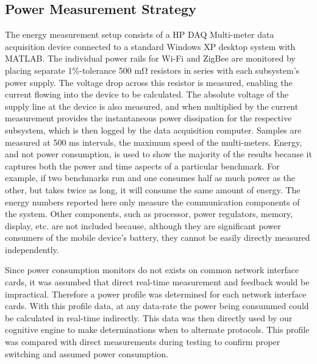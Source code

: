 \documentclass[conference]{IEEEtran}
\begin{document}
\subsection{Power Measurement Strategy}
The energy measurement setup consists of a HP DAQ Multi-meter data acquisition device connected to a standard Windows XP desktop system with MATLAB. The individual power rails for Wi-Fi and ZigBee are monitored by placing separate 1\%-tolerance 500 mΩ resistors in series with each subsystem’s power supply. The voltage drop across this resistor is measured, enabling the current flowing into the device to be calculated. The absolute voltage of the supply line at the device is also measured, and when multiplied by the current measurement provides the instantaneous power dissipation for the respective subsystem, which is then logged by the data acquisition computer. Samples are measured at 500 ms intervals, the maximum speed of the multi-meters.  Energy, and not power consumption, is used to show the majority of the results because it captures both the power and time aspects of a particular benchmark. For example, if two benchmarks run and one consumes half as much power as the other, but takes twice as long, it will consume the same amount of energy.  The energy numbers reported here only measure the communication components of the system.  Other components, such as processor, power regulators, memory, display, etc. are not included because, although they are significant power consumers of the mobile device’s battery, they cannot be easily directly measured independently.

Since power consumption monitors do not exists on common network interface cards, it was assumbed that direct real-time measurement and feedback would be impractical.  Therefore a power profile was determined for each network interface cards.  With this profile data, at any data-rate the power being consummed could be calculated in real-time indirectly.  This data was then directly used by our cognitive engine to make determinations when to alternate protocols.  This profile was compared with direct measurements during testing to confirm proper switching and assumed power consumption.
\end{document}
